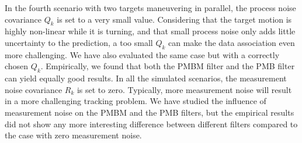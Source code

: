 \documentclass[journal]{IEEEtran}
\begin{document}
In the fourth scenario with two targets maneuvering in parallel, the process noise covariance $Q_k$ is set to a very small value. Considering that the target motion is highly non-linear while it is turning, and that small process noise only adds little uncertainty to the prediction, a too small $Q_k$ can make the data association even more challenging. We have also evaluated the same case but with a correctly chosen $Q_k$. Empirically, we found that both the PMBM filter and the PMB filter can yield equally good results. In all the simulated scenarios, the measurement noise covariance $R_k$ is set to zero. Typically, more measurement noise will result in a more challenging tracking problem. We have studied the influence of measurement noise on the PMBM and the PMB filters, but the empirical results did not show any more interesting difference between different filters compared to the case with zero measurement noise. 




\end{document}
